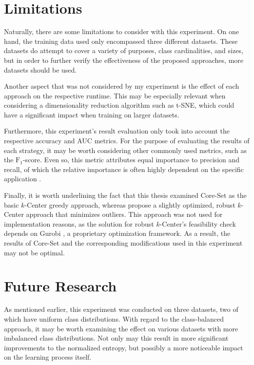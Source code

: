 \documentclass[english,bachelor,ul]{webisthesis} %
\begin{document}
\section{Limitations}

Naturally, there are some limitations to consider with this experiment. On one hand, the training data used only encompassed three different datasets. These datasets do attempt to cover a variety of purposes, class cardinalities, and sizes, but in order to further verify the effectiveness of the proposed approaches, more datasets should be used. 

Another aspect that was not considered by my experiment is the effect of each approach on the respective runtime. This may be especially relevant when considering a dimensionality reduction algorithm such as t-SNE, which could have a significant impact when training on larger datasets. 

Furthermore, this experiment's result evaluation only took into account the respective accuracy and AUC metrics. For the purpose of evaluating the results of each strategy, it may be worth considering other commonly used metrics, such as the $\text{F}_1$-score. Even so, this metric attributes equal importance to precision and recall, of which the relative importance is often highly dependent on the specific application \citep{DBLP:journals/sac/HandC18}.

Finally, it is worth underlining the fact that this thesis examined Core-Set as the basic $k$-Center greedy approach, whereas \cite{DBLP:conf/iclr/SenerS18} propose a slightly optimized, robust $k$-Center approach that minimizes outliers. This approach was not used for implementation reasons, as the solution for robust $k$-Center's feasibility check depends on Gurobi \citep{gurobi}, a proprietary optimization framework. As a result, the results of Core-Set and the corresponding modifications used in this experiment may not be optimal.

\section{Future Research}

As mentioned earlier, this experiment was conducted on three datasets, two of which have uniform class distributions. With regard to the class-balanced approach, it may be worth examining the effect on various datasets with more imbalanced class distributions. Not only may this result in more significant improvements to the normalized entropy, but possibly a more noticeable impact on the learning process itself. 
\end{document}
